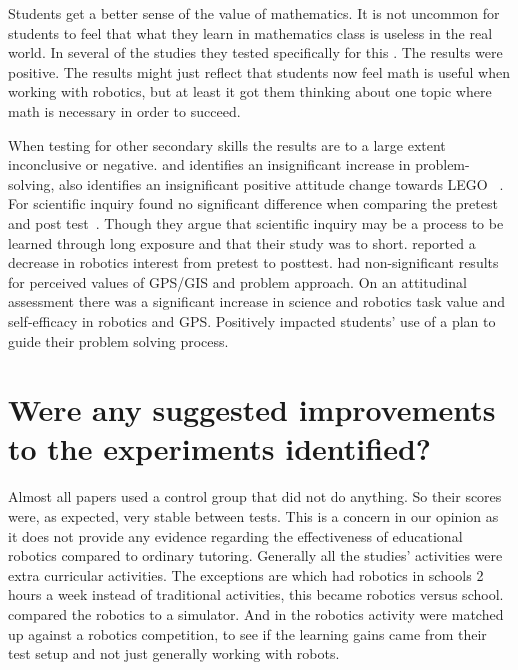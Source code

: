 \bigskip\noindent
Students get a better sense of the value of mathematics. It is not uncommon for students to feel that what they learn in mathematics class is useless in the real world. In several of the studies they tested specifically for this \cite{silk2011resources, nugent2009use}. The results were positive. The results might just reflect that students now feel math is useful when working with robotics, but at least it got them thinking about one topic where math is necessary in order to succeed. 

\bigskip\noindent
When testing for other secondary skills the results are to a large extent inconclusive or negative. 
\citeauthor{hussain2006effect} and \citeauthor{lindh2007does} identifies an insignificant increase  in problem-solving, \citeauthor{hussain2006effect} also identifies an insignificant positive attitude change towards LEGO ~\cite{hussain2006effect,lindh2007does}. 
For scientific inquiry \citeauthor{williams2007acquisition} found no significant difference when comparing the pretest and post test~\cite{williams2007acquisition}. 
Though they argue that scientific inquiry may be a process to be learned through long exposure and that their study was to short.
 reported a decrease in robotics interest from pretest to posttest. 
 had non-significant results for perceived values of GPS/GIS and problem approach. On an attitudinal assessment there was a significant increase in science and robotics task value and self-efficacy in robotics and GPS. 
 Positively impacted students' use of a plan to guide their problem solving process.

\section{Were any suggested improvements to the experiments identified?}
Almost all papers used a control group that did not do anything. So their scores were, as expected, very stable between tests. 
This is a concern in our opinion as it does not provide any evidence regarding the effectiveness of educational robotics compared to ordinary tutoring. 
Generally all the studies' activities were extra curricular activities. The exceptions are  which had robotics in schools 2 hours a week instead of traditional activities, this became robotics versus school.  compared the robotics to a simulator. And in  the robotics activity were matched up against a robotics competition, to see if the learning gains came from their test setup and not just generally working with robots. 

